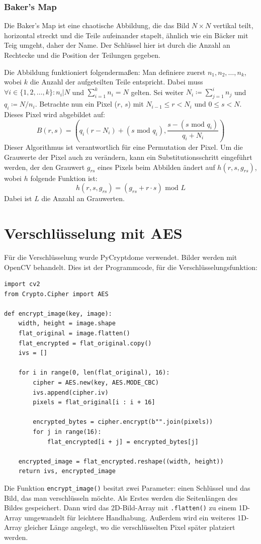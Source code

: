 \subsubsection{Baker's Map}
Die Baker's Map ist eine chaotische Abbildung, die das Bild $N \times N$ vertikal teilt, horizontal streckt und die Teile aufeinander stapelt, ähnlich
wie ein Bäcker mit Teig umgeht, daher der Name. Der Schlüssel hier ist durch die Anzahl an Rechtecke und die Position der Teilungen gegeben. \cite{chaos}

Die Abbildung funktioniert folgendermaßen: Man definiere zuerst $n_1, n_2, \dots , n_k$, wobei $k$ die Anzahl der aufgeteilten Teile entspricht.
Dabei muss $\forall i \in \{1, 2, \dots, k\} : n_i | N$ und $\sum_{i = 1}^{k} n_i = N$ gelten. Sei weiter $N_i \coloneq \sum_{j = 1}^{i} n_j$ und $q_i \coloneq N/n_i$.
Betrachte nun ein Pixel ($r$, $s$) mit $N_{i - 1} \leq r < N_i$ und $0 \leq s < N$. Dieses Pixel wird abgebildet auf:
$$B(r, s) =  (q_i(r - N_i) + (s \text{ mod } q_i), \frac{s - (s \text{ mod } q_i)}{q_i + N_i})$$
Dieser Algorithmus ist verantwortlich für eine Permutation der Pixel. Um die Grauwerte der Pixel auch zu verändern, kann ein Substitutionsschritt
eingeführt werden, der den Grauwert $g_{rs}$ eines Pixels beim Abbilden ändert auf $h(r, s, g_{rs})$, wobei $h$ folgende Funktion ist:
$$h(r, s, g_{rs}) = (g_{rs} + r \cdot s) \text{ mod } L$$
Dabei ist $L$ die Anzahl an Grauwerten.
\cite{chaos}

\section{Verschlüsselung mit AES}
Für die Verschlüsselung wurde PyCryptdome verwendet. Bilder werden mit OpenCV behandelt.
Dies ist der Programmcode, für die Verschlüsselungsfunktion:
\begin{lstlisting}
import cv2
from Crypto.Cipher import AES

def encrypt_image(key, image):
    width, height = image.shape
    flat_original = image.flatten()
    flat_encrypted = flat_original.copy()
    ivs = []

    for i in range(0, len(flat_original), 16):
        cipher = AES.new(key, AES.MODE_CBC)
        ivs.append(cipher.iv)
        pixels = flat_original[i : i + 16]

        encrypted_bytes = cipher.encrypt(b"".join(pixels))
        for j in range(16):
            flat_encrypted[i + j] = encrypted_bytes[j]

    encrypted_image = flat_encrypted.reshape((width, height))
    return ivs, encrypted_image
\end{lstlisting}
Die Funktion \lstinline{encrypt_image()} besitzt zwei Parameter: einen Schlüssel und das Bild,
das man verschlüsseln möchte. Als Erstes werden die Seitenlängen des Bildes gespeichert. Dann wird das 2D-Bild-Array
mit \lstinline{.flatten()} zu einem 1D-Array umgewandelt für leichtere Handhabung. Außerdem wird ein weiteres 1D-Array
gleicher Länge angelegt, wo die verschlüsselten Pixel später platziert werden.

